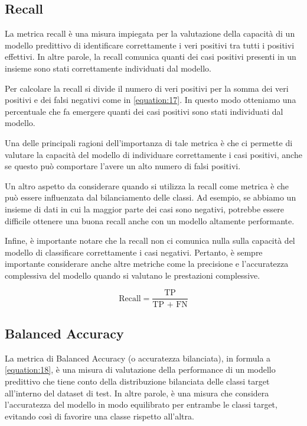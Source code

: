 \subsection{Recall}
La metrica recall è una misura impiegata per la valutazione della capacità di un modello predittivo di identificare correttamente i veri positivi tra tutti i positivi effettivi. In altre parole, la recall comunica quanti dei casi positivi presenti in un insieme sono stati correttamente individuati dal modello.

Per calcolare la recall si divide il numero di veri positivi per la somma dei veri positivi e dei falsi negativi come in \ref{equation:17}. In questo modo otteniamo una percentuale che fa emergere quanti dei casi positivi sono stati individuati dal modello.

Una delle principali ragioni dell’importanza di tale metrica è che ci permette di valutare la capacità del modello di individuare correttamente i casi positivi, anche se questo può comportare l’avere un alto numero di falsi positivi.

Un altro aspetto da considerare quando si utilizza la recall come metrica è che può essere influenzata dal bilanciamento delle classi. Ad esempio, se abbiamo un insieme di dati in cui la maggior parte dei casi sono negativi, potrebbe essere difficile ottenere una buona recall anche con un modello altamente performante.

Infine, è importante notare che la recall non ci comunica nulla sulla capacità del modello di classificare correttamente i casi negativi. Pertanto, è sempre importante considerare anche altre metriche come la precisione e l'accuratezza complessiva del modello quando si valutano le prestazioni complessive.

\begin{equation}
    \text{Recall} = \frac{\text{TP}}{\text{TP + FN}}
    \label{equation:17}
\end{equation}

\subsection{Balanced Accuracy}
La metrica di Balanced Accuracy (o accuratezza bilanciata), in formula a \ref{equation:18}, è una misura di valutazione della performance di un modello predittivo che tiene conto della distribuzione bilanciata delle classi target all'interno del dataset di test. In altre parole, è una misura che considera l'accuratezza del modello in modo equilibrato per entrambe le classi target, evitando così di favorire una classe rispetto all'altra.

